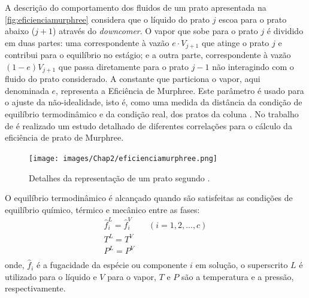 A descrição do comportamento dos fluidos de um prato apresentada na \autoref{fig:eficienciamurphree}
considera que o líquido do prato
$j$ escoa para o prato abaixo ($j+1$) através do \textit{downcomer}. O vapor que sobe para o prato $j$ é
dividido em duas partes: uma correspondente à vazão $e \cdot V_{j+1}$ que atinge o prato
$j$ e contribui para o equilíbrio no estágio; e a outra parte, correspondente à vazão $(1-e)V_{j+1}$ que passa
diretamente para o prato $j-1$ não interagindo com o fluido do
prato considerado. A constante que particiona o vapor, aqui denominada $e$, representa a Eficiência de Murphree. Este
parâmetro é usado para o ajuste da não-idealidade, isto é, como uma medida da distância da condição de equilíbrio
termodinâmico e da condição real, dos pratos da coluna \cite{Elgue:2004}.
No trabalho de
 é realizado um estudo detalhado de diferentes correlações para o cálculo da eficiência
de prato de Murphree.

 \begin{figure}[htb]
 \centering \texttt{[image: images/Chap2/eficienciamurphree.png]}
 \caption{Detalhes da representação de um prato segundo .}
 \label{fig:eficienciamurphree}
 \end{figure}

O equilíbrio termodinâmico é alcançado quando são satisfeitas as condições de equilíbrio químico, térmico e
mecânico entre as fases:
\begin{equation}
\begin{array}{c}
\hat{f}^L_i = \hat{f}^V_i \qquad (i = 1,2,...,c) \\
T^L = T^V \\
P^L = P^V \\
\end{array}
\end{equation}
onde, $\hat{f}_i$ é a fugacidade da espécie ou componente $i$ em solução, o superscrito
$L$ é utilizado para o líquido e $V$ para o vapor, $T$ e $P$ são a temperatura
e a pressão, respectivamente.


